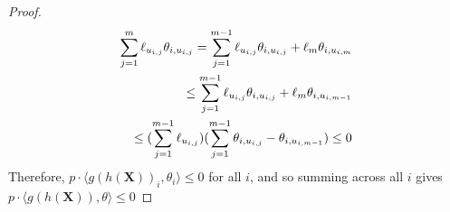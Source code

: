 \documentclass[11pt]{article}
\begin{document}
\begin{proof}
    \begin{align}
        \small 
        \sum_{j=1}^{m} \ell_{u_{i,j}} \theta_{i,u_{i,j}}  = \sum_{j=1}^{m-1} \ell_{u_{i,j}} \theta_{i,u_{i,j}} + \ell_{m} \theta_{i,u_{i,m}} 
        \\ \leq \sum_{j=1}^{m-1} \ell_{u_{i,j}} \theta_{i,u_{i,j}} + \ell_{m} \theta_{i,u_{i,m-1}}  
        \\ \leq (\sum_{j=1}^{m-1} \ell_{u_{i,j}}) (\sum_{j=1}^{m-1} \theta_{i,u_{i,j}} - \theta_{i,u_{i,m-1}}) \leq 0
    \end{align}
Therefore, $p \cdot \langle g(h(\mathbf{X}))_{i}, \theta_{i} \rangle \leq 0$ for all $i$, and so summing across all $i$ gives $p \cdot \langle g(h(\mathbf{X})) ,\theta \rangle \leq 0$
\end{proof}

\end{document}
